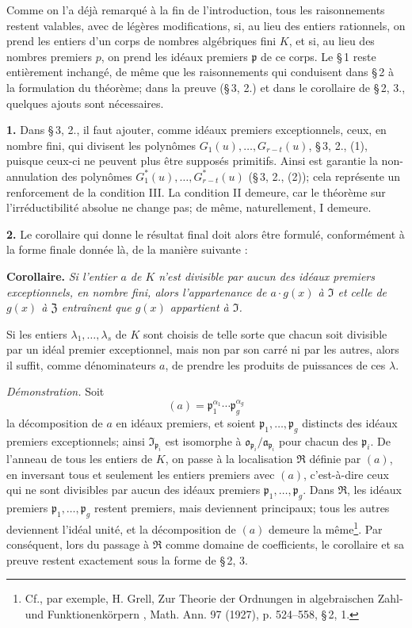 \smallskip
Comme on l'a déjà remarqué à la fin de l'introduction, tous les raisonnements restent valables, avec de légères modifications, si, au lieu des entiers rationnels, on prend les entiers d'un corps de nombres algébriques fini $K$, et si, au lieu des nombres premiers $p$, on prend les idéaux premiers $\mathfrak{p}$ de ce corps. Le \S\,1 reste entièrement inchangé, de même que les raisonnements qui conduisent dans \S\,2 à la formulation du théorème; dans la preuve (\S\,3, 2.) et dans le corollaire de \S\,2, 3., quelques ajouts sont nécessaires.

\medskip
\noindent\textbf{1.}
Dans \S\,3, 2., il faut ajouter, comme idéaux premiers exceptionnels, ceux, en nombre fini, qui divisent les polynômes $G_1(u),\ldots,G_{r-t}(u)$, \S\,3, 2., (1), puisque ceux-ci ne peuvent plus être supposés primitifs. Ainsi est garantie la non-annulation des polynômes $G^*_1(u),\ldots,G^*_{r-t}(u)$ (\S\,3, 2., (2)); cela représente un renforcement de la condition III. La condition II demeure, car le théorème sur l'irréductibilité absolue ne change pas; de même, naturellement, I demeure.

\medskip
\noindent\textbf{2.}
Le corollaire qui donne le résultat final doit alors être formulé, conformément à la forme finale donnée là, de la manière suivante :

\noindent\textbf{Corollaire.}
\textit{Si l'entier $a$ de $K$ n'est divisible par aucun des idéaux premiers exceptionnels, en nombre fini, alors l'appartenance de $a\cdot g(x)$ à $\mathfrak{I}$ et celle de $g(x)$ à $\mathfrak{Z}$ entraînent que $g(x)$ appartient à $\mathfrak{I}$.}

Si les entiers $\lambda_1,\ldots,\lambda_s$ de $K$ sont choisis de telle sorte que chacun soit divisible par un idéal premier exceptionnel, mais non par son carré ni par les autres, alors il suffit, comme dénominateurs $a$, de prendre les produits de puissances de ces $\lambda$.

\noindent\textit{Démonstration.}
Soit
\[
(a)=\mathfrak{p}_1^{\alpha_1}\cdots\mathfrak{p}_g^{\alpha_g}
\]
la décomposition de $a$ en idéaux premiers, et soient $\mathfrak{p}_1,\ldots,\mathfrak{p}_g$ distincts des idéaux premiers exceptionnels; ainsi $\mathfrak{I}_{\mathfrak{p}_i}$ est isomorphe à $\mathfrak{o}_{\mathfrak{p}_i}/\mathfrak{a}_{\mathfrak{p}_i}$ pour chacun des $\mathfrak{p}_i$. De l'anneau de tous les entiers de $K$, on passe à la localisation $\mathfrak{R}$ définie par $(a)$, en inversant tous et seulement les entiers premiers avec $(a)$, c'est-à-dire ceux qui ne sont divisibles par aucun des idéaux premiers $\mathfrak{p}_1,\ldots,\mathfrak{p}_g$. Dans $\mathfrak{R}$, les idéaux premiers $\mathfrak{p}_1,\ldots,\mathfrak{p}_g$ restent premiers, mais deviennent principaux; tous les autres deviennent l'idéal unité, et la décomposition de $(a)$ demeure la même\footnote{Cf., par exemple, H. Grell, \og{} Zur Theorie der Ordnungen in algebraischen Zahl- und Funktionenkörpern \fg{}, Math. Ann. 97 (1927), p. 524--558, \S\,2, 1.}. Par conséquent, lors du passage à $\mathfrak{R}$ comme domaine de coefficients, le corollaire et sa preuve restent exactement sous la forme de \S\,2, 3.

